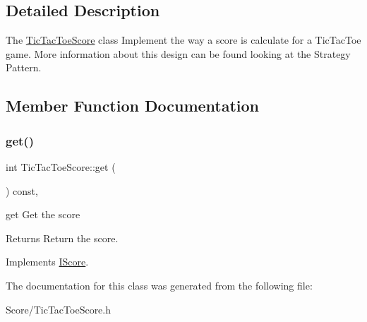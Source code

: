 \subsection{Detailed Description}
The \hyperlink{class_tic_tac_toe_score}{Tic\+Tac\+Toe\+Score} class Implement the way a score is calculate for a Tic\+Tac\+Toe game. More information about this design can be found looking at the Strategy Pattern. 

\subsection{Member Function Documentation}
\mbox{\label{class_tic_tac_toe_score_a6fd4f04069d34b7bb9a2ca11d8a644cc}} 
\subsubsection{\texorpdfstring{get()}{get()}}
{\footnotesize\ttfamily int Tic\+Tac\+Toe\+Score\+::get (\begin{DoxyParamCaption}{ }\end{DoxyParamCaption}) const\hspace{0.3cm}{\ttfamily [inline]}, {\ttfamily [virtual]}}



get Get the score 

\begin{DoxyReturn}{Returns}
Return the score. 
\end{DoxyReturn}


Implements \hyperlink{class_i_score}{I\+Score}.



The documentation for this class was generated from the following file\+:\begin{DoxyCompactItemize}
\item 
Score/Tic\+Tac\+Toe\+Score.\+h\end{DoxyCompactItemize}
